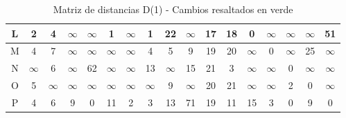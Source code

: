 \documentclass[12pt]{article}
\begin{document}
\begin{table}[h!]
\begin{tabular}{|c|c|c|c|c|c|c|c|c|c|c|c|c|c|c|c|c|}
L & 2 & 4 & $\infty$ & $\infty$ & 1 & $\infty$ & 1 & 22 & $\infty$ & \cellcolor{lightgreen} 17 & \cellcolor{lightgreen} 18 & 0 & $\infty$ & $\infty$ & $\infty$ & 51 \\\hline
M & 4 & 7 & $\infty$ & $\infty$ & $\infty$ & $\infty$ & 4 & 5 & 9 & \cellcolor{lightgreen} 19 & \cellcolor{lightgreen} 20 & $\infty$ & 0 & $\infty$ & 25 & $\infty$ \\\hline
N & $\infty$ & 6 & $\infty$ & 62 & $\infty$ & $\infty$ & 13 & $\infty$ & 15 & 21 & 3 & $\infty$ & $\infty$ & 0 & $\infty$ & $\infty$ \\\hline
O & 5 & $\infty$ & $\infty$ & $\infty$ & $\infty$ & $\infty$ & $\infty$ & 9 & $\infty$ & \cellcolor{lightgreen} 20 & \cellcolor{lightgreen} 21 & $\infty$ & $\infty$ & 2 & 0 & $\infty$ \\\hline
P & 4 & 6 & 9 & 0 & 11 & 2 & 3 & 13 & 71 & \cellcolor{lightgreen} 19 & 11 & 15 & 3 & 0 & 9 & 0 \\\hline
\end{tabular}
\caption{Matriz de distancias D(1) - Cambios resaltados en verde}
\end{table}
\end{document}
